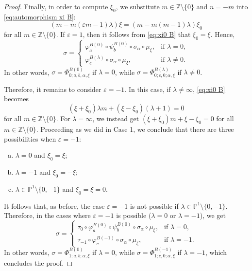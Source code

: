 \documentclass[10pt,a4paper]{amsart}
\newcommand{\PP}{\mathbb{P}}
\newcommand{\ZZ}{\mathbb{Z}}
\newcommand{\nonzero}{\setminus \{0\}}
\begin{document}
\begin{proof}
    Finally, in order to compute $\xi_0$, we substitute $m \in \ZZ \nonzero$ and $n = -m$ into \eqref{eq:automorphism xi B}:
    \begin{equation}\label{eq:xi0 B}
        (m - m(\varepsilon m - 1)\lambda)\xi = (m - m(m - 1)\lambda)\xi_0
    \end{equation}
    for all $m \in \ZZ \nonzero$. If $\varepsilon = 1$, then it follows from \eqref{eq:xi0 B} that $\xi_0 = \xi$. Hence,
    $$\sigma = \begin{cases}
        \varphi_a^{B(0)} \circ \psi_b^{B(0)} \circ \sigma_\alpha \circ \mu_\xi, &\text{if } \lambda = 0, \\
        \varphi_c^{B(\lambda)} \circ \sigma_\alpha \circ \mu_\xi, &\text{if } \lambda \neq 0.
    \end{cases}$$
    In other words, $\sigma = \Phi_{0;a,b,\alpha,\xi}^{B(0)}$ if $\lambda = 0$, while $\sigma = \Phi_{0;c,0;\alpha,\xi}^{B(\lambda)}$ if $\lambda \neq 0$.
    
    Therefore, it remains to consider $\varepsilon = -1$. In this case, if $\lambda \neq \infty$, \eqref{eq:xi0 B} becomes
    $$(\xi + \xi_0)\lambda m + (\xi - \xi_0)(\lambda + 1) = 0$$
    for all $m \in \ZZ \nonzero$. For $\lambda = \infty$, we instead get $(\xi + \xi_0)m + \xi - \xi_0 = 0$ for all $m \in \ZZ \nonzero$. Proceeding as we did in Case 1, we conclude that there are three possibilities when $\varepsilon = -1$:
    \begin{enumerate}[(a)]
        \item $\lambda = 0$ and $\xi_0 = \xi$;
        \item $\lambda = -1$ and $\xi_0 = -\xi$;
        \item $\lambda \in \PP^1 \setminus \{0,-1\}$ and $\xi_0 = \xi = 0$.
    \end{enumerate}
    It follows that, as before, the case $\varepsilon = -1$ is not possible if $\lambda \in \PP^1 \setminus \{0,-1\}$. Therefore, in the cases where $\varepsilon = -1$ is possible ($\lambda = 0$ or $\lambda = -1$), we get
    $$\sigma = \begin{cases}
        \tau_0 \circ \varphi_a^{B(0)} \circ \psi_b^{B(0)} \circ \sigma_\alpha \circ \mu_\xi, &\text{if } \lambda = 0, \\
        \tau_{-1} \circ \varphi_c^{B(-1)} \circ \sigma_\alpha \circ \mu_\xi, &\text{if } \lambda = -1.
    \end{cases}$$
    In other words, $\sigma = \Phi_{1;a,b;\alpha,\xi}^{B(0)}$ if $\lambda = 0$, while $\sigma = \Phi_{1;c,0;\alpha,\xi}^{B(-1)}$ if $\lambda = -1$, which concludes the proof.
\end{proof}
\end{document}

